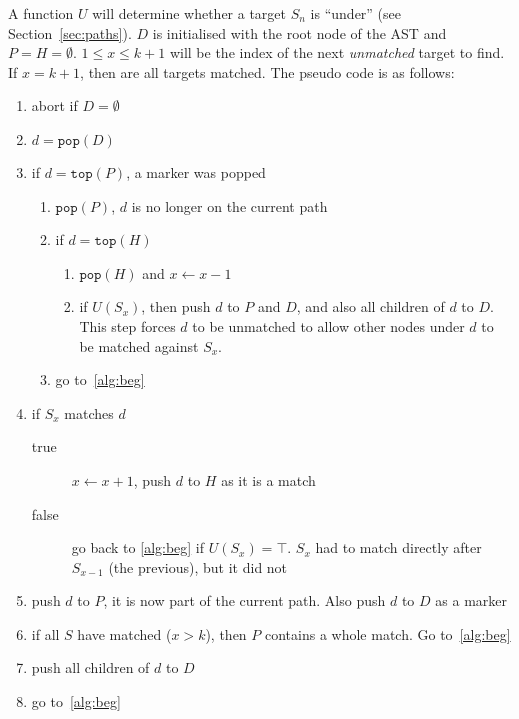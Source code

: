 \documentclass[a4paper,12pt]{article}
\begin{document}
A function $U$
will determine whether a target $S_n$ is ``under'' (see Section~\ref{sec:paths}). $D$ is
initialised with the root node of the AST and $P = H = \emptyset$. $1 \leq x \leq k+1$ will be the index of
the next \emph{unmatched} target to find. If $x = k+1$, then are all targets matched.
The pseudo code is as follows:

\begin{enumerate}[noitemsep]
  \item\label{alg:beg} abort if $D = \emptyset$
  \item $d = \mathtt{pop}(D)$
  \item if $d = \mathtt{top}(P)$, a marker was popped
    \begin{enumerate}
      \item $\mathtt{pop}(P)$, $d$ is no longer on the current path
      \item if $d = \mathtt{top}(H)$
      \begin{enumerate}
        \item $\mathtt{pop}(H)$ and $x \gets x-1$
        \item if $U(S_x)$, then push $d$ to $P$ and $D$, and also all children of $d$ to $D$.
        This step forces $d$ to be unmatched to allow other nodes under $d$ to
        be matched against $S_x$.
      \end{enumerate}
      \item go to~\ref{alg:beg}
    \end{enumerate}
  \item if $S_x$ matches $d$
    \begin{description}
      \item[true] $x \gets x+1$, push $d$ to $H$ as it is a match
      \item[false] go back to \ref{alg:beg} if $U(S_x) = \top$. $S_x$ had to match
      directly after $S_{x-1}$ (the previous), but it did not
    \end{description}
  \item push $d$ to $P$, it is now part of the current path. Also push $d$ to $D$ as a marker
  \item if all $S$ have matched ($x > k$), then $P$ contains a whole match. Go to~\ref{alg:beg}
  \item push all children of $d$ to $D$
  \item go to~\ref{alg:beg}
\end{enumerate}
\end{document}
